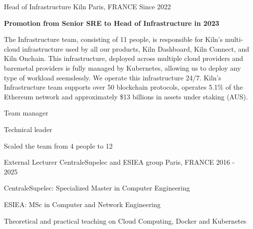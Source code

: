 

\begin{cventries}
\cventry
    {Head of Infrastructure} %
    {Kiln} %
    {Paris, FRANCE} %
    {Since 2022} %
    {
      \begin{cvitems} %
      \item {\textbf{Promotion from Senior SRE to Head of Infrastructure in 2023}}
      \item {The Infrastructure team, consisting of 11 people, is responsible
        for Kiln's multi-cloud infrastructure used by all our products, Kiln
          Dashboard, Kiln Connect, and Kiln Onchain. This infrastructure,
          deployed across multiple cloud providers and baremetal providers
          is fully managed by Kubernetes, allowing us to deploy any
          type of workload seemslessly. We operate this infrastructure 24/7.
          Kiln's Infrastructure team supports over 50 blockchain protocols,
          operates 5.1\% of the Ethereum network and approximately \$13
          billions in assets under staking (AUS).}
        \item {Team manager}
        \item {Technical leader}
        \item {Scaled the team from 4 people to 12}
      \end{cvitems}
    }
  \cventry
    {External Lecturer} %
    {CentraleSupelec and ESIEA group}
    {Paris, FRANCE} %
    {2016 - 2025} %
    {
      \begin{cvitems} %
        \item {CentraleSupelec: Specialized Master in Computer Engineering}
        \item {ESIEA: MSc in Computer and Network Engineering}
        \item {Theoretical and practical teaching on Cloud Computing, Docker
          and Kubernetes}
      \end{cvitems}
}
\end{cventries}
